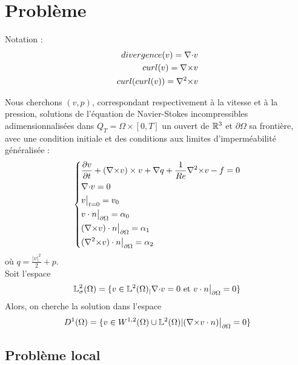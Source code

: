 \section{Problème}
Notation : 
\begin{eqnarray*}
divergence(v)={\nabla\cdot} v\\
curl(v)={\nabla\times} v\\
curl(curl(v))={\nabla^2\times} v
\end{eqnarray*}

Nous cherchons $(v,p)$, correspondant respectivement à la vitesse et à la pression, solutions de l'équation de Navier-Stokes incompressibles adimensionnalisées dans $Q_T=\Omega\times[0,T]$ un ouvert de ${\mathbb{R}}^3$ et $\partial\Omega$ sa frontière, avec une condition initiale et des conditions aux limites d'imperméabilité généralisée :
\begin{eqnarray}
\label{depart}
\left\{
\begin{aligned}
&\frac{\partial v}{\partial t} + ({\nabla\times}  v)\times v + {\nabla} q + \frac{1}{Re}{\nabla^2\times}  v-f = 0\\
&{\nabla\cdot} v = 0\\
&v\big\rvert_{t=0} = v_0\\
&v\cdot n{\big\rvert_{\partial\Omega}} = \alpha_0\\
&({\nabla\times}  v)\cdot n{\big\rvert_{\partial\Omega}} = \alpha_1\\
&({\nabla^2\times}  v)\cdot n{\big\rvert_{\partial\Omega}} = \alpha_2
\end{aligned}
\right.
\end{eqnarray}
où $q = \frac{|v|^2}{2}+p$.\\

Soit l'espace
\[
{\mathbb{L}}^2_\sigma(\Omega) = \{v \in {\mathbb{L}}^2(\Omega)_| {\nabla\cdot} v = 0\text{ et }v\cdot n{\big\rvert_{\partial\Omega}} = 0 \}
\]
Alors, on cherche la solution dans l'espace
\[
D^1(\Omega) = \{v\in W^{1,2}(\Omega) \cup {\mathbb{L}}^2(\Omega) | ({\nabla\times} v\cdot n){\big\rvert_{\partial\Omega}} = 0  \}
\]

\subsection{Problème local}

